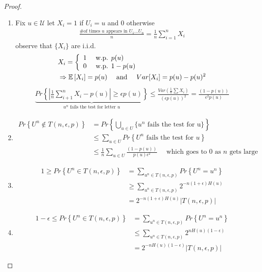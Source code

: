 \documentclass[twoside]{article}
\theoremstyle{definition} %
\renewcommand{\Pr}[1]{Pr\left\{#1\right\}}
\newcommand{\Ex}[1]{\mathbb{E}\left[#1\right]}
\def\U{\mathcal{U}}
\begin{document}
\begin{proof}
  \begin{enumerate}
    \item
    Fix $u \in \U$ let $X_i = 1$ if $ U_i = u$ and $0$ otherwise
    \begin{align*}
      \frac{\text{\# of times } u \text{ appears in } U_1 ... U_n}{n} = \frac{1}{n} \sum_{i = 1}^n X_i
    \end{align*}
    observe that $\{ X_i \}$ are i.i.d.
    \begin{align*}
      &X_i =
      \left\{
        \begin{array}{l l}
          1 & \text{ w.p. } p(u) \\
          0 & \text{ w.p. } 1 - p(u)
        \end{array}
      \right. \\
      &\Rightarrow \Ex{X_i} = p(u) \quad \text{ and } \quad Var[X_i] = p(u) - p(u)^2 \\
    \end{align*}
    \begin{align*}
      \underbrace{
        \Pr{|\frac{1}{n} \sum_{i+1}^n X_i - p(u)|\geq \epsilon p(u)}
      }_{u^n \text{ fails the test for letter } u}
      \leq
      \frac{Var(\frac{1}{n} \sum X_i)}{(\epsilon p(u))^2}
      = \frac{(1 - p(u))}{\epsilon^2 p(u)}
    \end{align*}

    \item
    \begin{align*}
      \Pr{U^n \not \in T(n, \epsilon, p)} &= \Pr{\bigcup_{u \in U} \{u^n \text{ fails the test for u} \}} \\
      &\leq \sum_{u \in U} \Pr{U^n \text{ fails the test for } u} \\
      &\leq \frac{1}{n} \sum_{u \in U} \frac{(1 - p(u))}{p(u) \epsilon^2} \quad \text{ which goes to 0 as } n \text{ gets large}
    \end{align*}

    \item
    \begin{align*}
      1 \geq \Pr{U^n \in T(n, \epsilon, p)} &= \sum_{u^n \in T(n, \epsilon, p)} \Pr{U^n = u^n} \\
      &\geq \sum_{u^n \in T(n, \epsilon, p)} 2^{-n(1 + \epsilon) H(u)} \\
      &= 2^{-n (1 + \epsilon) H(u)} |T(n, \epsilon, p)|
    \end{align*}

    \item
    \begin{align*}
      1 - \epsilon \leq \Pr{U^n \in T(n, \epsilon, p)} &= \sum_{u^n \in T(n, \epsilon, p)} \Pr{U^n = u^n} \\
       &\leq \sum_{u^n \in T(n, \epsilon, p)} 2^{n H(u)(1-\epsilon)} \\
       &= 2^{-n H(u)(1 - \epsilon)} |T(n, \epsilon, p)|
    \end{align*}

  \end{enumerate}
\end{proof}
\end{document}
